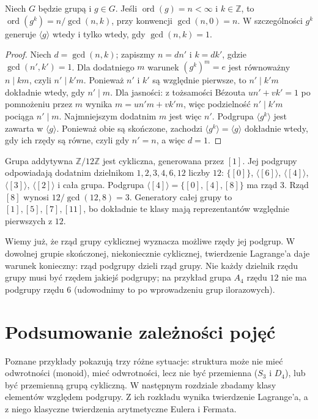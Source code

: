 \begin{twierdzenie}
\label{aa:tw:rzad-potegi}
Niech $G$ będzie grupą i $g\in G$. Jeśli $\operatorname{ord}(g)=n<\infty$ i $k\in\mathbb Z$,
to $\operatorname{ord}(g^k)=n/\gcd(n,k)$,
przy konwencji $\gcd(n,0)=n$. W szczególności $g^k$ generuje
$\langle g\rangle$ wtedy i tylko wtedy, gdy $\gcd(n,k)=1$.
\end{twierdzenie}
\begin{proof}
Niech $d=\gcd(n,k)$; zapiszmy $n=dn'$ i $k=dk'$,
gdzie $\gcd(n',k')=1$. Dla dodatniego $m$ warunek
$(g^k)^m=e$ jest równoważny $n\mid km$, czyli $n'\mid k'm$.
Ponieważ $n'$ i $k'$ są względnie pierwsze, to
$n'\mid k'm$ dokładnie wtedy, gdy $n'\mid m$.
Dla jasności: z tożsamości Bézouta $un'+vk'=1$
po pomnożeniu przez $m$ wynika
$m=un'm+vk'm$, więc podzielność $n'\mid k'm$
pociąga $n'\mid m$. Najmniejszym dodatnim $m$ jest więc $n'$.
Podgrupa $\langle g^k\rangle$ jest zawarta w $\langle g\rangle$.
Ponieważ obie są skończone, zachodzi $\langle g^k\rangle=\langle g\rangle$
dokładnie wtedy, gdy ich rzędy są równe, czyli gdy $n'=n$,
a więc $d=1$.
\end{proof}

\begin{przyklad}
\label{aa:prz:z12}
Grupa addytywna $\mathbb Z/12\mathbb Z$ jest cykliczna,
generowana przez $[1]$. Jej podgrupy odpowiadają dodatnim dzielnikom
$1,2,3,4,6,12$ liczby $12$:
$\{[0]\}$, $\langle[6]\rangle$,
$\langle[4]\rangle$, $\langle[3]\rangle$,
$\langle[2]\rangle$ i cała grupa.
Podgrupa $\langle[4]\rangle=\{[0],[4],[8]\}$ ma rząd $3$.
Rząd $[8]$ wynosi $12/\gcd(12,8)=3$.
Generatory całej grupy to $[1],[5],[7],[11]$,
bo dokładnie te klasy mają reprezentantów względnie pierwszych z $12$.
\end{przyklad}

\begin{uwaga}
Wiemy już, że rząd grupy cyklicznej wyznacza możliwe rzędy jej
podgrup. W dowolnej grupie skończonej, niekoniecznie cyklicznej,
twierdzenie Lagrange'a daje warunek konieczny:
rząd podgrupy dzieli rząd grupy. Nie każdy dzielnik
rzędu grupy musi być rzędem jakiejś podgrupy; na przykład
grupa $A_4$ rzędu $12$ nie ma podgrupy rzędu $6$
(udowodnimy to po wprowadzeniu grup ilorazowych).
\end{uwaga}

\section{Podsumowanie zależności pojęć}
Poznane przykłady pokazują trzy różne sytuacje: struktura może
nie mieć odwrotności (monoid), mieć odwrotności, lecz nie być
przemienna ($S_3$ i $D_4$), lub być przemienną grupą cykliczną.
W następnym rozdziale zbadamy klasy elementów względem podgrupy.
Z ich rozkładu wynika twierdzenie Lagrange'a, a z niego
klasyczne twierdzenia arytmetyczne Eulera i Fermata.
